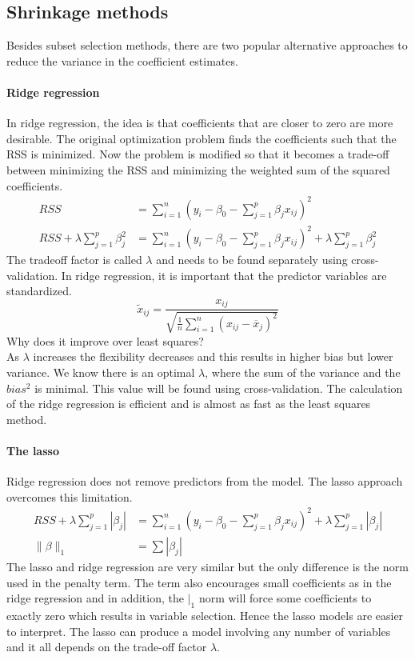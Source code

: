 \documentclass[../document.tex]{subfiles}
\begin{document}
	\subsection{Shrinkage methods}
	Besides subset selection methods, there are two popular alternative approaches to reduce the variance in the coefficient estimates.
	\paragraph{Ridge regression}
	In ridge regression, the idea is that coefficients that are closer to zero are more desirable. The original optimization problem finds the coefficients such that the RSS is minimized. Now the problem is modified so that it becomes a trade-off between minimizing the RSS and minimizing the weighted sum of the squared coefficients.
	\begin{equation}
	\begin{split}
		RSS &= \sum_{i=1}^{n}(y_{i}-\beta_{0}-\sum_{j=1}^{p}\beta_{j}x_{ij})^2\\
		RSS+\lambda\sum_{j=1}^{p}\beta_{j}^2 &= \sum_{i=1}^{n}(y_{i}-\beta_{0}-\sum_{j=1}^{p}\beta_{j}x_{ij})^2+\lambda\sum_{j=1}^{p}\beta_{j}^2
	\end{split}
	\end{equation}
	The tradeoff factor is called \(\lambda\) and needs to be found separately using cross-validation. In ridge regression, it is important that the predictor variables are standardized.
	\begin{equation}
		\tilde{x}_{ij}=\frac{x_{ij}}{\sqrt{\frac{1}{n}\sum_{i=1}^{n}(x_{ij}-\overline{x}_{j})^2}}
	\end{equation}
	Why does it improve over least squares?\\
	As \(\lambda\) increases the flexibility decreases and this results in higher bias but lower variance. We know there is an optimal \(\lambda\), where the sum of the variance and the \(bias^2\) is minimal. This value will be found using cross-validation. The calculation of the ridge regression is efficient and is almost as fast as the least squares method.
	\paragraph{The lasso}
	Ridge regression does not remove predictors from the model. The lasso approach overcomes this limitation.
	\begin{equation}
	\begin{split}
		RSS+\lambda\sum_{j=1}^{p}|\beta_{j}| &= \sum_{i=1}^{n}(y_{i}-\beta_{0}-\sum_{j=1}^{p}\beta_{j}x_{ij})^2+\lambda\sum_{j=1}^{p}|\beta_{j}|\\
		\|\beta\|_{1}&=\sum|\beta_{j}|
	\end{split}
	\end{equation}
	The lasso and ridge regression are very similar but the only difference is the norm used in the penalty term. The term also encourages small coefficients as in the ridge regression and in addition, the \(|_{1}\) norm will force some coefficients to exactly zero which results in variable selection. Hence the lasso models are easier to interpret. The lasso can produce a model involving any number of variables and it all depends on the trade-off factor \(\lambda\).
\end{document}
